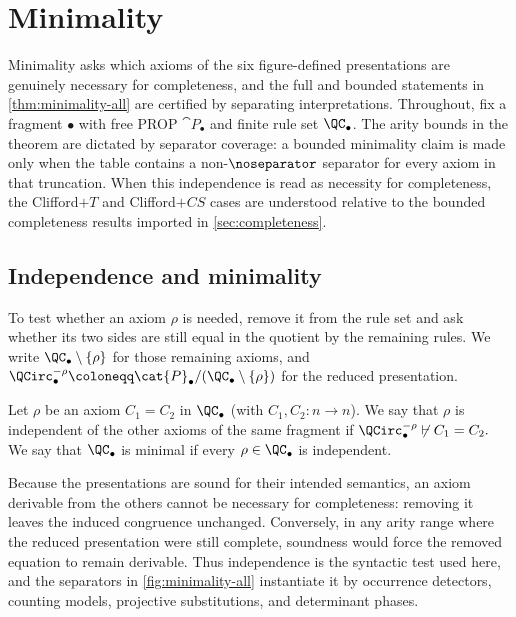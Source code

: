 \section{Minimality}\label{sec:minimality}

Minimality asks which axioms of the six figure-defined presentations are genuinely necessary for
completeness, and the full and bounded statements in \cref{thm:minimality-all} are certified by
separating interpretations.  Throughout, fix a fragment \(\bullet\) with free PROP
\(\cat{P}_\bullet\) and finite rule set \(\QC_\bullet\).  The arity bounds in the theorem are dictated
by separator coverage: a bounded minimality claim is made only when the table contains a
non-\(\noseparator\) separator for every axiom in that truncation.  When this independence is read as
necessity for completeness, the Clifford\(+T\) and Clifford\(+CS\) cases are understood relative to the
bounded completeness results imported in \cref{sec:completeness}.

\subsection{Independence and minimality}

To test whether an axiom \(\rho\) is needed, remove it from the rule set and ask whether its two sides
are still equal in the quotient by the remaining rules.  We write
\(\QC_\bullet\setminus\{\rho\}\) for those remaining axioms, and
\(\QCirc_\bullet^{-\rho}\coloneqq \cat{P}_\bullet/(\QC_\bullet\setminus\{\rho\})\) for the reduced
presentation.

\begin{definition}\label{def:minimality}
Let \(\rho\) be an axiom \(C_1=C_2\) in \(\QC_\bullet\) (with \(C_1,C_2:n\to n\)).
We say that \(\rho\) is independent of the other axioms of the same fragment if
\(
  \QCirc_\bullet^{-\rho}\not\vdash C_1=C_2.
\)
We say that \(\QC_\bullet\) is minimal if every \(\rho\in\QC_\bullet\) is independent.
\end{definition}

Because the presentations are sound for their intended semantics, an axiom derivable from the
others cannot be necessary for completeness: removing it leaves the induced congruence unchanged.
Conversely, in any arity range where the reduced presentation were still complete, soundness would
force the removed equation to remain derivable.  Thus independence is the syntactic test used here,
and the separators in \cref{fig:minimality-all} instantiate it by occurrence detectors, counting
models, projective substitutions, and determinant phases.

